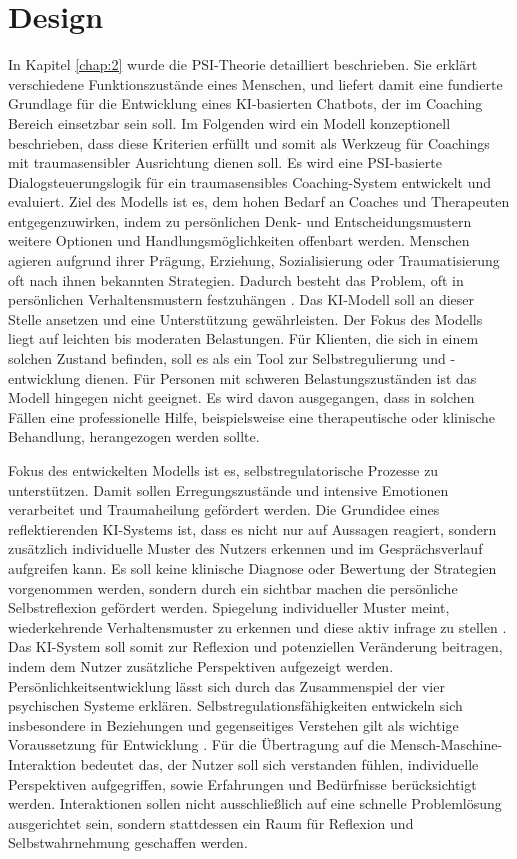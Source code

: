 \chapter{Design} \label{chap:3}

In Kapitel \ref{chap:2} wurde die PSI-Theorie detailliert beschrieben. Sie erklärt verschiedene Funktionszustände eines Menschen, und liefert damit eine fundierte Grundlage für die Entwicklung eines KI-basierten Chatbots, der im Coaching Bereich einsetzbar sein soll. Im Folgenden wird ein Modell konzeptionell beschrieben, dass diese Kriterien erfüllt und somit als Werkzeug für Coachings mit traumasensibler Ausrichtung dienen soll. Es wird eine PSI-basierte Dialogsteuerungslogik für ein traumasensibles Coaching-System entwickelt und evaluiert. Ziel des Modells ist es, dem hohen Bedarf an Coaches und Therapeuten entgegenzuwirken, indem zu persönlichen Denk- und Entscheidungsmustern weitere Optionen und Handlungsmöglichkeiten offenbart werden. Menschen agieren aufgrund ihrer Prägung, Erziehung, Sozialisierung oder Traumatisierung oft nach ihnen bekannten Strategien. Dadurch besteht das Problem, oft in persönlichen Verhaltensmustern festzuhängen \citep{re1989compulsion}. Das KI-Modell soll an dieser Stelle ansetzen und eine Unterstützung gewährleisten. Der Fokus des Modells liegt auf leichten bis moderaten Belastungen. Für Klienten, die sich in einem solchen Zustand befinden, soll es als ein Tool zur Selbstregulierung und -entwicklung dienen. Für Personen mit schweren Belastungszuständen ist das Modell hingegen nicht geeignet. Es wird davon ausgegangen, dass in solchen Fällen eine professionelle Hilfe, beispielsweise eine therapeutische oder klinische Behandlung, herangezogen werden sollte.

Fokus des entwickelten Modells ist es, selbstregulatorische Prozesse zu unterstützen. Damit sollen Erregungszustände und intensive Emotionen verarbeitet und Traumaheilung gefördert werden. Die Grundidee eines reflektierenden KI-Systems ist, dass es nicht nur auf Aussagen reagiert, sondern zusätzlich individuelle Muster des Nutzers erkennen und im Gesprächsverlauf aufgreifen kann. Es soll keine klinische Diagnose oder Bewertung der Strategien vorgenommen werden, sondern durch ein sichtbar machen die persönliche Selbstreflexion gefördert werden. Spiegelung individueller Muster meint, wiederkehrende Verhaltensmuster zu erkennen und diese aktiv infrage zu stellen \citep{Xiao2025Humanizing}. Das KI-System soll somit zur Reflexion und potenziellen Veränderung beitragen, indem dem Nutzer zusätzliche Perspektiven aufgezeigt werden. Persönlichkeitsentwicklung lässt sich durch das Zusammenspiel der vier psychischen Systeme erklären. Selbstregulationsfähigkeiten entwickeln sich insbesondere in Beziehungen und gegenseitiges Verstehen gilt als wichtige Voraussetzung für Entwicklung \citep{kuhl2005neue,kuhl2014psi}. Für die Übertragung auf die Mensch-Maschine-Interaktion bedeutet das, der Nutzer soll sich verstanden fühlen, individuelle Perspektiven aufgegriffen, sowie Erfahrungen und Bedürfnisse berücksichtigt werden. Interaktionen sollen nicht ausschließlich auf eine schnelle Problemlösung ausgerichtet sein, sondern stattdessen ein Raum für Reflexion und Selbstwahrnehmung geschaffen werden.

